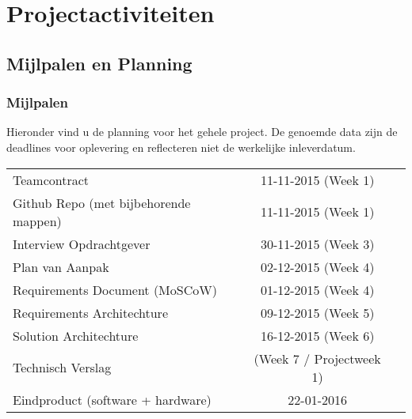 \chapter{Projectactiviteiten}

\section{Mijlpalen en Planning}
\subsection{Mijlpalen}
Hieronder vind u de planning voor het gehele project. De genoemde data zijn de deadlines voor oplevering en reflecteren niet de werkelijke inleverdatum.
\begin{table}[]
\centering
\begin{tabular}{ l c r }
  Teamcontract & 11-11-2015 (Week 1) \\
  Github Repo (met bijbehorende mappen) & 11-11-2015 (Week 1) \\
  Interview Opdrachtgever & 30-11-2015 (Week 3) \\
  Plan van Aanpak & 02-12-2015 (Week 4) \\
  Requirements Document (MoSCoW) & 01-12-2015 (Week 4) \\
  Requirements Architechture &  09-12-2015 (Week 5) \\
  Solution Architechture & 16-12-2015 (Week 6) \\
  Technisch Verslag	& (Week 7 / Projectweek 1) \\
  Eindproduct (software + hardware)	& 22-01-2016 \\
\end{tabular}
\end{table}

